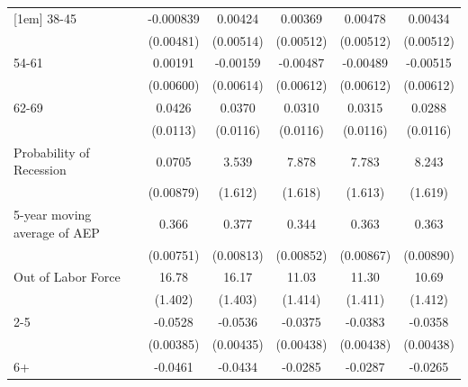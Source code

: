 {\begin{tabular}{l*{5}{c}}
[1em]
38-45               &   -0.000839         &     0.00424         &     0.00369         &     0.00478         &     0.00434         \\
                    &   (0.00481)         &   (0.00514)         &   (0.00512)         &   (0.00512)         &   (0.00512)         \\
[1em]
54-61               &     0.00191         &    -0.00159         &    -0.00487         &    -0.00489         &    -0.00515         \\
                    &   (0.00600)         &   (0.00614)         &   (0.00612)         &   (0.00612)         &   (0.00612)         \\
[1em]
62-69               &      0.0426\sym{***}&      0.0370\sym{***}&      0.0310\sym{***}&      0.0315\sym{***}&      0.0288\sym{**} \\
                    &    (0.0113)         &    (0.0116)         &    (0.0116)         &    (0.0116)         &    (0.0116)         \\
[1em]
Probability of Recession&      0.0705\sym{***}&       3.539\sym{**} &       7.878\sym{***}&       7.783\sym{***}&       8.243\sym{***}\\
                    &   (0.00879)         &     (1.612)         &     (1.618)         &     (1.613)         &     (1.619)         \\
[1em]
5-year moving average of AEP&       0.366\sym{***}&       0.377\sym{***}&       0.344\sym{***}&       0.363\sym{***}&       0.363\sym{***}\\
                    &   (0.00751)         &   (0.00813)         &   (0.00852)         &   (0.00867)         &   (0.00890)         \\
[1em]
Out of Labor Force  &       16.78\sym{***}&       16.17\sym{***}&       11.03\sym{***}&       11.30\sym{***}&       10.69\sym{***}\\
                    &     (1.402)         &     (1.403)         &     (1.414)         &     (1.411)         &     (1.412)         \\
[1em]
2-5                 &     -0.0528\sym{***}&     -0.0536\sym{***}&     -0.0375\sym{***}&     -0.0383\sym{***}&     -0.0358\sym{***}\\
                    &   (0.00385)         &   (0.00435)         &   (0.00438)         &   (0.00438)         &   (0.00438)         \\
[1em]
6+                  &     -0.0461\sym{***}&     -0.0434\sym{***}&     -0.0285\sym{***}&     -0.0287\sym{***}&     -0.0265\sym{***}\\

\end{tabular}}

